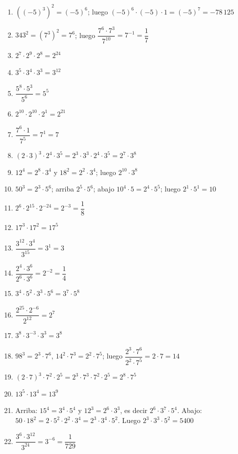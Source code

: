 \documentclass[12pt, letterpaper]{article}
\begin{document}
\begin{enumerate}[leftmargin=*, label=\textbf{\arabic*.}]
  \item $\left((-5)^3\right)^2 = (-5)^6$; luego $(-5)^6 \cdot (-5) \cdot 1 = (-5)^7 = -78\,125$
  \item $343^2 = (7^3)^2 = 7^6$; luego $\dfrac{7^6 \cdot 7^3}{7^{10}} = 7^{-1} = \dfrac{1}{7}$
  \item $2^7 \cdot 2^9 \cdot 2^8 = 2^{24}$
  \item $3^5 \cdot 3^4 \cdot 3^3 = 3^{12}$
  \item $\dfrac{5^8 \cdot 5^3}{5^6} = 5^5$
  \item $2^{10} \cdot 2^{10} \cdot 2^1 = 2^{21}$
  \item $\dfrac{7^6 \cdot 1}{7^5} = 7^1 = 7$
  \item $(2 \cdot 3)^3 \cdot 2^4 \cdot 3^5 = 2^3 \cdot 3^3 \cdot 2^4 \cdot 3^5 = 2^7 \cdot 3^8$
  \item $12^4 = 2^8 \cdot 3^4$ y $18^2 = 2^2 \cdot 3^4$; luego $2^{10} \cdot 3^8$
  \item $50^3 = 2^3 \cdot 5^6$; arriba $2^5 \cdot 5^6$; abajo $10^4 \cdot 5 = 2^4 \cdot 5^5$; luego $2^1 \cdot 5^1 = 10$
  \item $2^6 \cdot 2^{15} \cdot 2^{-24} = 2^{-3} = \dfrac{1}{8}$
  \item $17^3 \cdot 17^2 = 17^5$
  \item $\dfrac{3^{12} \cdot 3^4}{3^{15}} = 3^{1} = 3$
  \item $\dfrac{2^4 \cdot 3^6}{2^6 \cdot 3^6} = 2^{-2} = \dfrac{1}{4}$
  \item $3^4 \cdot 5^2 \cdot 3^3 \cdot 5^6 = 3^7 \cdot 5^8$
  \item $\dfrac{2^{25} \cdot 2^{-6}}{2^{12}} = 2^{7}$
  \item $3^8 \cdot 3^{-3} \cdot 3^3 = 3^{8}$
  \item $98^3 = 2^3 \cdot 7^6$, $14^2 \cdot 7^3 = 2^2 \cdot 7^5$; luego $\dfrac{2^3 \cdot 7^6}{2^2 \cdot 7^5} = 2 \cdot 7 = 14$
  \item $(2 \cdot 7)^3 \cdot 7^2 \cdot 2^5 = 2^3 \cdot 7^3 \cdot 7^2 \cdot 2^5 = 2^8 \cdot 7^5$
  \item $13^5 \cdot 13^4 = 13^9$
  \item Arriba: $15^4 = 3^4 \cdot 5^4$ y $12^3 = 2^6 \cdot 3^3$, es decir $2^6 \cdot 3^7 \cdot 5^4$. Abajo: $50 \cdot 18^2 = 2 \cdot 5^2 \cdot 2^2 \cdot 3^4 = 2^3 \cdot 3^4 \cdot 5^2$. Luego $2^3 \cdot 3^3 \cdot 5^2 = 5400$
  \item $\dfrac{3^6 \cdot 3^{12}}{3^{24}} = 3^{-6} = \dfrac{1}{729}$
\end{enumerate}
\end{document}
